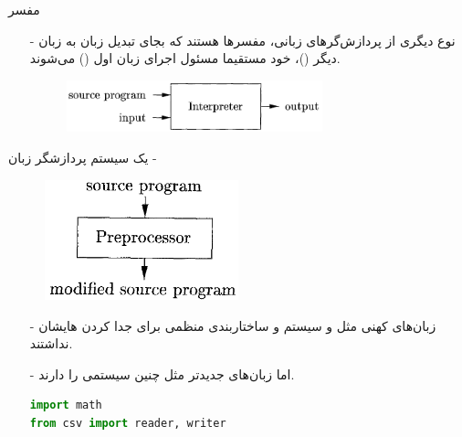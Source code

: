 \begin{frame}{مفسر}
\begin{itemize}\itemr
\item[-]
نوع دیگری از پردازش‌گر‌های زبانی، مفسرها هستند که بجای تبدیل زبان به زبان دیگر ()، خود مستقیما مسئول اجرای زبان اول () می‌شوند.
\vspace{5mm}
\begin{figure}[H]
\begin{center}
\includegraphics[width=0.7\textwidth, height=0.3\textheight, angle=0]{docs/images/interpreter}
\end{center}
\end{figure}
\end{itemize}
\end{frame}

\begin{frame}{یک سیستم پردازشگر زبان - }
\begin{figure}[H]
\begin{center}
\includegraphics[width=0.5\textwidth, height=0.5\textheight, angle=0.6]{docs/images/preprocessor}
\end{center}
\end{figure}
\end{frame}

\begin{frame}[fragile]{}
\begin{itemize}\itemr
\item[-]
زبان‌های کهنی مثل  و  سیستم  و ساختاربندی منظمی برای جدا کردن هایشان نداشتند.

\item[-]
اما زبان‌های جدیدتر مثل  چنین سیستمی را دارند.

\begin{latin}
\begin{lstlisting}[language=python]
import math
from csv import reader, writer
\end{lstlisting}
\end{latin}
\end{itemize}
\end{frame}

